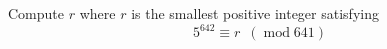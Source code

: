 Compute $r$ where $r$ is the smallest positive integer satisfying
\[
 5^{642} \equiv r \,\,\,(\operatorname{mod} 641)
\]
